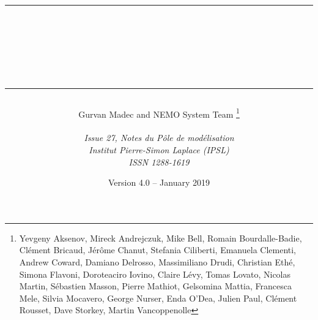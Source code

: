 \documentclass[a4paper, 11pt]{book}
\newcommand{\biblio}{}
\newcommand{\pindex}{\printindex}
\begin{document}
\renewcommand{\biblio}{}
\renewcommand{\pindex}{}




\title{
\vspace{ 1.4cm}\rule{345pt}{1.5pt}													\\
\vspace{0.45cm}{\Huge NEMO ocean engine}											\\
\rule{345pt}{1.5pt}
}

\author{
  \Large Gurvan Madec and NEMO System Team
  \thanks{
    Yevgeny Aksenov, Mireck Andrejczuk, Mike Bell, Romain Bourdalle-Badie, Cl\'{e}ment Bricaud,
    J\'{e}r\^{o}me Chanut, Stefania Ciliberti, Emanuela Clementi, Andrew Coward, Damiano Delrosso,
    Massimiliano Drudi, Christian Eth\'{e}, Simona Flavoni, Doroteaciro Iovino, Claire L\'{e}vy, Tomas Lovato,
    Nicolas Martin, S\'{e}bastien Masson, Pierre Mathiot, Gelsomina Mattia, Francesca Mele, Silvia Mocavero,
    George Nurser, Enda O'Dea, Julien Paul, Cl\'{e}ment Rousset, Dave Storkey, Martin Vancoppenolle
  }                                                        \\
                                                           \\
  \textit{Issue 27, Notes du P\^{o}le de mod\'{e}lisation} \\
  \textit{Institut Pierre-Simon Laplace (IPSL)}            \\
  \textit{ISSN 1288-1619}
}

\date{Version 4.0 -- January 2019}

\maketitle
\frontmatter



\dominitoc
\tableofcontents


\end{document}
